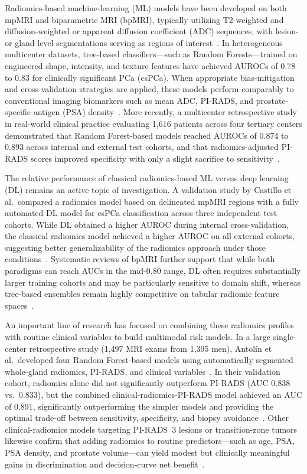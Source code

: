 \documentclass[11pt]{article}
\begin{document}
Radiomics-based machine-learning (ML) models have been developed on both mpMRI and biparametric MRI (bpMRI), typically utilizing T2-weighted and diffusion-weighted or apparent diffusion coefficient (ADC) sequences, with lesion- or gland-level segmentations serving as regions of interest~\citep{QIMS2022PerformanceVar,Diagnostics2022BpMRIReview}. In heterogeneous multicenter datasets, tree-based classifiers—such as Random Forests—trained on engineered shape, intensity, and texture features have achieved AUROCs of 0.78 to 0.83 for clinically significant PCa (csPCa). When appropriate bias-mitigation and cross-validation strategies are applied, these models perform comparably to conventional imaging biomarkers such as mean ADC, PI-RADS, and prostate-specific antigen (PSA) density~\citep{QIMS2022PerformanceVar,Diagnostics2022BpMRIReview}. More recently, a multicenter retrospective study in real-world clinical practice evaluating 1{,}616 patients across four tertiary centers demonstrated that Random Forest-based models reached AUROCs of 0.874 to 0.893 across internal and external test cohorts, and that radiomics-adjusted PI-RADS scores improved specificity with only a slight sacrifice to sensitivity~\citep{Bao2024}.

The relative performance of classical radiomics-based ML versus deep learning (DL) remains an active topic of investigation. A validation study by Castillo et al.\ compared a radiomics model based on delineated mpMRI regions with a fully automated DL model for csPCa classification across three independent test cohorts. While DL obtained a higher AUROC during internal cross-validation, the classical radiomics model achieved a higher AUROC on all external cohorts, suggesting better generalizability of the radiomics approach under those conditions~\citep{Castillo2022Cancers}. Systematic reviews of bpMRI further support that while both paradigms can reach AUCs in the mid-0.80 range, DL often requires substantially larger training cohorts and may be particularly sensitive to domain shift, whereas tree-based ensembles remain highly competitive on tabular radiomic feature spaces~\citep{Diagnostics2022BpMRIReview,castillo2020automated}.

An important line of research has focused on combining these radiomics profiles with routine clinical variables to build multimodal risk models. In a large single-center retrospective study (1{,}497 MRI exams from 1{,}395 men), Antol{\'i}n et al.\ developed four Random Forest-based models using automatically segmented whole-gland radiomics, PI-RADS, and clinical variables~\citep{Antolin2026Insights}. In their validation cohort, radiomics alone did not significantly outperform PI-RADS (AUC 0.838 vs.\ 0.833), but the combined clinical-radiomics-PI-RADS model achieved an AUC of 0.891, significantly outperforming the simpler models and providing the optimal trade-off between sensitivity, specificity, and biopsy avoidance~\citep{Antolin2026Insights}. Other clinical-radiomics models targeting PI-RADS~3 lesions or transition-zone tumors likewise confirm that adding radiomics to routine predictors—such as age, PSA, PSA density, and prostate volume—can yield modest but clinically meaningful gains in discrimination and decision-curve net benefit~\citep{BMC2025PIRADS3,FrontOnc2026TZRadiomics}.
\end{document}
